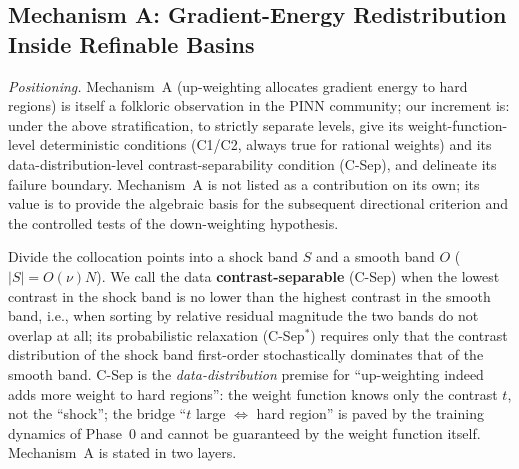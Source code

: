 \documentclass[11pt]{article}
\numberwithin{equation}{section}
\begin{document}
\subsection{Mechanism A: Gradient-Energy Redistribution Inside Refinable Basins}\label{sec:theta-mechA}

\noindent\emph{Positioning.} Mechanism~A (up-weighting allocates gradient energy to hard regions) is itself a folkloric observation in the PINN community; our increment is: under the above stratification, to strictly separate levels, give its weight-function-level deterministic conditions (C1/C2, always true for rational weights) and its data-distribution-level contrast-separability condition (C-Sep), and delineate its failure boundary. Mechanism~A is not listed as a contribution on its own; its value is to provide the algebraic basis for the subsequent directional criterion and the controlled tests of the down-weighting hypothesis.

Divide the collocation points into a shock band $S$ and a smooth band $O$ ($|S|=O(\nu)N$). We call the data \textbf{contrast-separable} (C-Sep) when the lowest contrast in the shock band is no lower than the highest contrast in the smooth band, i.e., when sorting by relative residual magnitude the two bands do not overlap at all; its probabilistic relaxation (C-Sep$^*$) requires only that the contrast distribution of the shock band first-order stochastically dominates that of the smooth band. C-Sep is the \emph{data-distribution} premise for ``up-weighting indeed adds more weight to hard regions'': the weight function knows only the contrast $t$, not the ``shock''; the bridge ``$t$ large $\Leftrightarrow$ hard region'' is paved by the training dynamics of Phase~0 and cannot be guaranteed by the weight function itself. Mechanism~A is stated in two layers.
\end{document}
